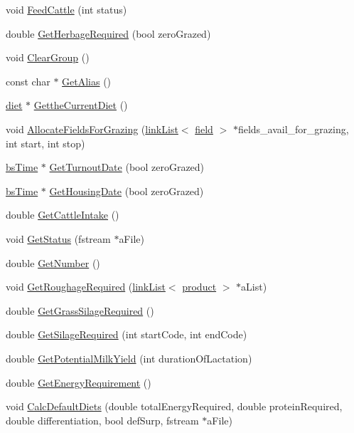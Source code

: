 \begin{DoxyCompactItemize}
\item 
void \hyperlink{classcattle_feeding_group_ad2bf7d9b8bedfc9c9bb2d3b56cbaaaab}{FeedCattle} (int status)
\item 
double \hyperlink{classcattle_feeding_group_a73a60e87d7ad14e554628cb3c2cf5479}{GetHerbageRequired} (bool zeroGrazed)
\item 
void \hyperlink{classcattle_feeding_group_a316f768cdd74f27d1e09368264b9bbf6}{ClearGroup} ()
\item 
const char $\ast$ \hyperlink{classcattle_feeding_group_a0b0c7cb1e42ad2196c20d2d2e27425e8}{GetAlias} ()
\item 
\hyperlink{classdiet}{diet} $\ast$ \hyperlink{classcattle_feeding_group_ad0caa51b3844badf0a53a864a77d8aae}{GettheCurrentDiet} ()
\item 
void \hyperlink{classcattle_feeding_group_a035950bdc3bfd5e231fc7e989fc42015}{AllocateFieldsForGrazing} (\hyperlink{classlink_list}{linkList}$<$ \hyperlink{classfield}{field} $>$ $\ast$fields\_\-avail\_\-for\_\-grazing, int start, int stop)
\item 
\hyperlink{classbs_time}{bsTime} $\ast$ \hyperlink{classcattle_feeding_group_a94c12951ed4f9b0adf04a2fbaf9750d9}{GetTurnoutDate} (bool zeroGrazed)
\item 
\hyperlink{classbs_time}{bsTime} $\ast$ \hyperlink{classcattle_feeding_group_a931bbdf43c3c84f1deaf7c3fdf28057d}{GetHousingDate} (bool zeroGrazed)
\item 
double \hyperlink{classcattle_feeding_group_a626ab41f5d4f6a59e270f1c51ae8209b}{GetCattleIntake} ()
\item 
void \hyperlink{classcattle_feeding_group_a42a42ccbe65d305a2cc7a27b8fed7b3d}{GetStatus} (fstream $\ast$aFile)
\item 
double \hyperlink{classcattle_feeding_group_ad0d0a50e79dbe845d4b1d758aeac13a6}{GetNumber} ()
\item 
void \hyperlink{classcattle_feeding_group_a4373e70dc994d95875f88f886e217718}{GetRoughageRequired} (\hyperlink{classlink_list}{linkList}$<$ \hyperlink{classproduct}{product} $>$ $\ast$aList)
\item 
double \hyperlink{classcattle_feeding_group_af51aa5afca9eeaeef17d554a763ff5cf}{GetGrassSilageRequired} ()
\item 
double \hyperlink{classcattle_feeding_group_a57898f313dd869bc2b3ed50dfd60c2ee}{GetSilageRequired} (int startCode, int endCode)
\item 
double \hyperlink{classcattle_feeding_group_ad7ec765b9f8860e45628d43af6ec8fde}{GetPotentialMilkYield} (int durationOfLactation)
\item 
double \hyperlink{classcattle_feeding_group_a01afbfab10482291dc976a51b57463f3}{GetEnergyRequirement} ()
\item 
void \hyperlink{classcattle_feeding_group_ad040236c2e171aa23bfc0acf0226d7b9}{CalcDefaultDiets} (double totalEnergyRequired, double proteinRequired, double differentiation, bool defSurp, fstream $\ast$aFile)
\end{DoxyCompactItemize}


